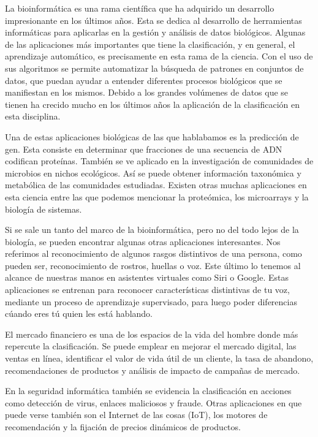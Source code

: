 \documentclass{llncs}
\begin{document}
La bioinform\'atica es una rama cient\'ifica que ha adquirido un desarrollo impresionante en los \'ultimos a\~nos. Esta se dedica al desarrollo de herramientas inform\'aticas para aplicarlas en la gesti\'on y an\'alisis de datos biol\'ogicos. Algunas  de las aplicaciones m\'as importantes que tiene la clasificaci\'on, y en general, el aprendizaje autom\'atico, es precisamente en esta rama de la ciencia. Con el uso de sus algoritmos se permite automatizar la b\'usqueda de patrones en conjuntos de datos, que puedan ayudar a entender diferentes procesos biol\'ogicos que se manifiestan en los mismos. Debido a los grandes vol\'umenes de datos que se tienen ha crecido mucho en los \'ultimos a\~nos la aplicaci\'on de la clasificaci\'on en esta disciplina.

Una de estas aplicaciones biol\'ogicas de las que hablabamos es la predicci\'on de gen. Esta consiste en determinar que fracciones de una secuencia de ADN codifican prote\'inas. Tambi\'en se ve aplicado en la investigaci\'on de comunidades de microbios en nichos ecol\'ogicos. As\'i se puede obtener informaci\'on taxon\'omica y metab\'olica de las comunidades estudiadas. Existen otras muchas aplicaciones en esta ciencia entre las que podemos mencionar la prote\'omica, los microarrays y la biolog\'ia de sistemas.

Si se sale un tanto del marco de la bioinform\'atica, pero no del todo lejos de la biolog\'ia, se pueden encontrar algunas otras aplicaciones interesantes. Nos referimos al reconocimiento de algunos rasgos distintivos de una persona, como pueden ser, reconocimiento de rostros, huellas o voz. Este \'ultimo lo tenemos al alcance de nuestras manos en asistentes virtuales como Siri o  Google. Estas aplicaciones se entrenan para reconocer caracter\'isticas distintivas de tu voz, mediante un proceso de aprendizaje supervisado, para luego poder diferencias c\'uando eres t\'u quien les est\'a hablando.

El mercado financiero es una de los espacios de la vida del hombre donde m\'as repercute la clasificaci\'on. Se puede emplear en mejorar el mercado digital, las ventas en l\'inea, identificar el valor de vida \'util de un cliente, la tasa de abandono, recomendaciones de productos y an\'alisis de impacto de campa\~nas de mercado.

En la seguridad inform\'atica tambi\'en se evidencia la clasificaci\'on en acciones como detecci\'on de virus, enlaces maliciosos y fraude. Otras aplicaciones en que puede verse tambi\'en son el Internet de las cosas (IoT), los motores de recomendaci\'on y la fijaci\'on de precios din\'amicos de productos.
\end{document}
